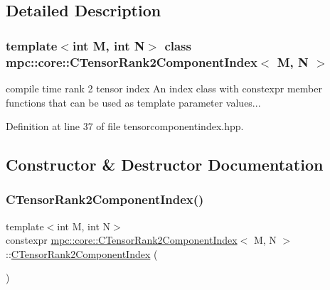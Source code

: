 \subsection{Detailed Description}
\subsubsection*{template$<$int M, int N$>$\newline
class mpc\+::core\+::\+C\+Tensor\+Rank2\+Component\+Index$<$ M, N $>$}

compile time rank 2 tensor index An index class with constexpr member functions that can be used as template parameter values... 

Definition at line 37 of file tensorcomponentindex.\+hpp.



\subsection{Constructor \& Destructor Documentation}
\mbox{\label{classmpc_1_1core_1_1_c_tensor_rank2_component_index_a46ac9bf492508d77742028988f69935e}} 
\subsubsection{\texorpdfstring{C\+Tensor\+Rank2\+Component\+Index()}{CTensorRank2ComponentIndex()}\hspace{0.1cm}{\footnotesize\ttfamily [1/2]}}
{\footnotesize\ttfamily template$<$int M, int N$>$ \\
constexpr \mbox{\hyperlink{classmpc_1_1core_1_1_c_tensor_rank2_component_index}{mpc\+::core\+::\+C\+Tensor\+Rank2\+Component\+Index}}$<$ M, N $>$\+::\mbox{\hyperlink{classmpc_1_1core_1_1_c_tensor_rank2_component_index}{C\+Tensor\+Rank2\+Component\+Index}} (\begin{DoxyParamCaption}{ }\end{DoxyParamCaption})\hspace{0.3cm}{\ttfamily [inline]}}




